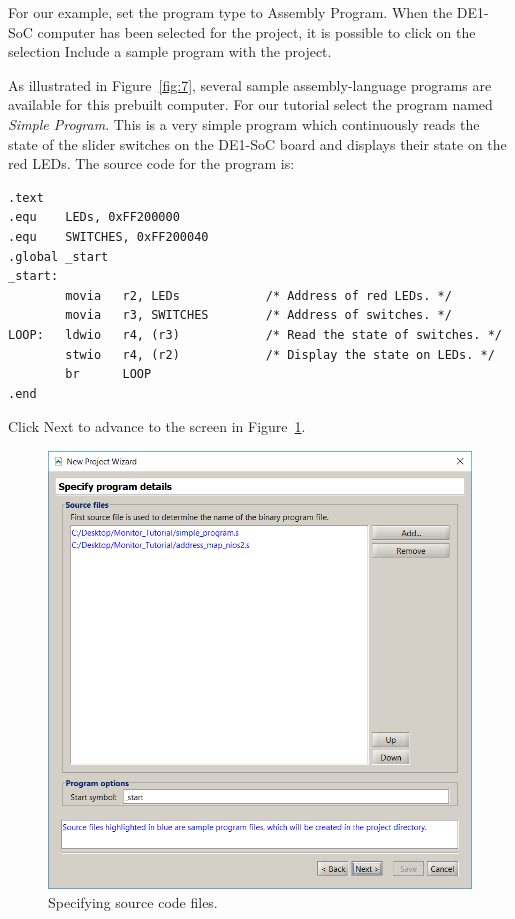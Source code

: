 \documentclass[11pt, twoside, pdftex]{article}
\begin{document}
\begin{enumerate}
For our example, set the program type to {\sf Assembly Program}.
When the DE1-SoC computer has been selected for the project, 
it is possible to click on the
selection {\sf Include a sample program with the project}.

As illustrated in Figure~\ref{fig:7}, several sample 
assembly-language programs are available for this prebuilt
computer.  For our tutorial select the program named 
{\it Simple Program}. This is a very simple program which
continuously reads the state of the slider switches on the
DE1-SoC board and displays their state on the red LEDs.
The source code for the program is:

\lstset{style=defaultNiosStyle}
\begin{center}
\begin{minipage}[t]{16 cm}
\begin{lstlisting}
.text
.equ	LEDs, 0xFF200000
.equ	SWITCHES, 0xFF200040
.global _start
_start:
		movia	r2, LEDs			/* Address of red LEDs. */ 
		movia	r3, SWITCHES		/* Address of switches. */
LOOP:	ldwio 	r4, (r3)			/* Read the state of switches. */
		stwio	r4, (r2)			/* Display the state on LEDs. */
		br		LOOP
.end
\end{lstlisting}
\end{minipage}
\end{center}

Click {\sf Next} to advance to the screen in Figure~\ref{fig:8}.\\

\begin{figure}[H]
   \begin{center} \includegraphics[scale=0.5]{screenshots/figure8.png}
   \end{center}
   \caption{Specifying source code files.} 
	 \label{fig:8}
\end{figure}


\end{enumerate}
\end{document}
